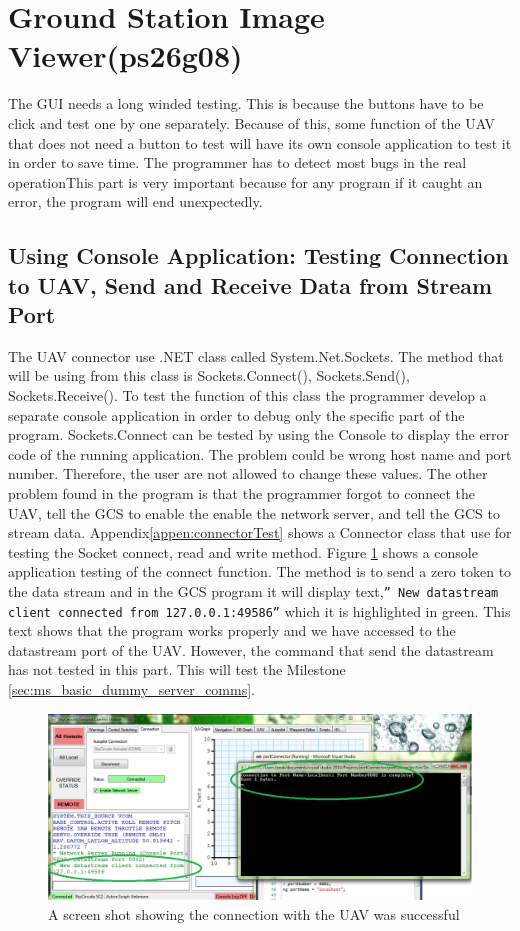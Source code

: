 \section{Ground Station Image Viewer(ps26g08)}
The GUI needs a long winded testing. This is because the buttons have to be click and test one by one separately. Because of this, some function of the UAV that does not need a button to test will have its own console application to test it in order to save time. The programmer has to detect most bugs in the real operationThis part is very important because for any program if it caught an error, the program will end unexpectedly.
\subsection{Using Console Application: Testing Connection to UAV, Send and Receive Data from Stream Port}
The UAV connector use .NET class called System.Net.Sockets. The method that will be using from this class is Sockets.Connect(), Sockets.Send(), Sockets.Receive(). To test the function of this class the programmer develop a separate console application in order to debug only the specific part of the program. Sockets.Connect can be tested by using the Console to display the error code of the running application. The problem could be wrong host name and port number. Therefore, the user are not allowed to change these values. The other problem found in the program is that the programmer forgot to connect the UAV, tell the GCS to enable the enable the network server, and tell the GCS to stream data. Appendix\ref{appen:connectorTest} shows a Connector class that use for testing the Socket connect, read and write method.
Figure \ref{connect to Stream Port} shows a console application testing of the connect function. 
The method is to send a zero token to the data stream and in the GCS program it will display text,\texttt{''\* New datastream client connected from 127.0.0.1:49586''} which it is highlighted in green. 
This text shows that the program works properly and we have accessed to the datastream port of the UAV.
However, the command that send the datastream has not tested in this part. 
This will test the Milestone \ref{sec:ms_basic_dummy_server_comms}.
\begin{figure}[H]
\begin{center}
\includegraphics[width=1.00\textwidth]{testing_screenshots/test_sending.png} 
\end{center}
\caption{A screen shot showing the connection with the UAV was successful\label{connect to Stream Port}}
\end{figure}

